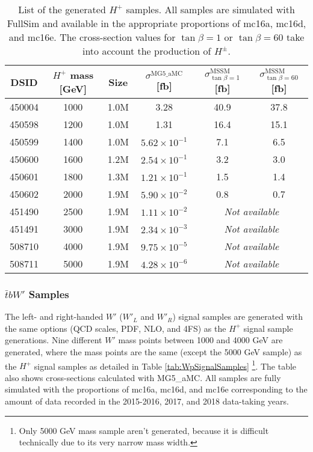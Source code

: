 \begin{table}[H]
  \centering
  \begin{tabular*}{160mm}{@{\extracolsep{\fill}}cccccc}
    \hline\hline
    DSID   & $H^{+}$ mass [GeV] & Size & ${\sigma}^{\text{MG5\_aMC}}$ [fb] & ${\sigma}_{\tan{\beta}=1}^{\text{MSSM}}$ [fb] & ${\sigma}_{\tan{\beta}=60}^{\text{MSSM}}$ [fb]\\
    \hline
    450004 & 1000 & 1.0M & 3.28                  & 40.9 & 37.8\\
    450598 & 1200 & 1.0M & 1.31                  & 16.4 & 15.1\\
    450599 & 1400 & 1.0M & $5.62{\times}10^{-1}$ &  7.1 &  6.5\\
    450600 & 1600 & 1.2M & $2.54{\times}10^{-1}$ &  3.2 &  3.0\\
    450601 & 1800 & 1.3M & $1.21{\times}10^{-1}$ &  1.5 &  1.4\\
    450602 & 2000 & 1.9M & $5.90{\times}10^{-2}$ &  0.8 &  0.7\\
    451490 & 2500 & 1.9M & $1.11{\times}10^{-2}$ & \multicolumn{2}{c}{\textit{Not available}}\\
    451491 & 3000 & 1.9M & $2.34{\times}10^{-3}$ & \multicolumn{2}{c}{\textit{Not available}}\\     
    508710 & 4000 & 1.9M & $9.75{\times}10^{-5}$ & \multicolumn{2}{c}{\textit{Not available}}\\     
    508711 & 5000 & 1.9M & $4.28{\times}10^{-6}$ & \multicolumn{2}{c}{\textit{Not available}}\\     
    \hline\hline
  \end{tabular*}
  \caption{List of the generated $H^{+}$ samples. All samples are simulated with FullSim and available in the appropriate proportions of mc16a, mc16d, and mc16e. The cross-section values for $\tan{\beta}=1$ or $\tan{\beta}=60$ take into account the production of $H^{\pm}$.}
  \label{tab:HpSignalSamples}
\end{table}

\subsubsection{$\bar{t}bW'$ Samples}
\label{subsec:WpSample}
The left- and right-handed $W'$ ($W'_{L}$ and $W'_{R}$) signal samples are generated with the same options (QCD scales, PDF, NLO, and 4FS) as the $H^{+}$ signal sample generations. Nine different $W'$ mass points between 1000 and 4000 GeV are generated, where the mass points are the same (except the 5000 GeV sample) as the $H^{+}$ signal samples as detailed in Table \ref{tab:WpSignalSamples} \footnote{Only 5000 GeV mass sample aren't generated, because it is difficult technically due to its very narrow mass width.}. The table also shows cross-sections calculated with MG5\_aMC. All samples are fully simulated with the proportions of mc16a, mc16d, and mc16e corresponding to the amount of data recorded in the 2015-2016, 2017, and 2018 data-taking years. 

